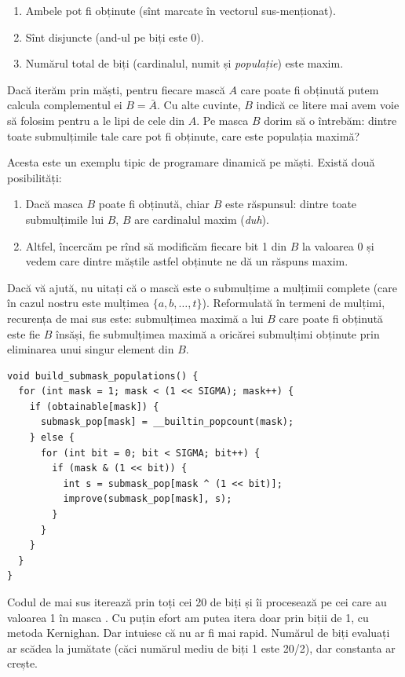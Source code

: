 \documentclass[../main.tex]{subfiles}
\begin{document}
\begin{enumerate}
  \item Ambele pot fi obținute (sînt marcate în vectorul sus-menționat).
  \item Sînt disjuncte (and-ul pe biți este 0).
  \item Numărul  total de biți (cardinalul, numit și \textit{populație}) este maxim.
\end{enumerate}

Dacă iterăm prin măști, pentru fiecare mască $A$ care poate fi obținută putem calcula complementul ei $B = \bar{A}$. Cu alte cuvinte, $B$ indică ce litere mai avem voie să folosim pentru a le lipi de cele din $A$. Pe masca $B$ dorim să o întrebăm: dintre toate submulțimile tale care pot fi obținute, care este populația maximă?

Acesta este un exemplu tipic de programare dinamică pe măști. Există două posibilități:

\begin{enumerate}
  \item Dacă masca $B$ poate fi obținută, chiar $B$ este răspunsul: dintre toate submulțimile lui $B$, $B$ are cardinalul maxim (\textit{duh}).

  \item Altfel, încercăm pe rînd să modificăm fiecare bit 1 din $B$ la valoarea 0 și vedem care dintre măștile astfel obținute ne dă un răspuns maxim.
\end{enumerate}

Dacă vă ajută, nu uitați că o mască este o submulțime a mulțimii complete (care în cazul nostru este mulțimea $\{a, b, \dots, t\}$). Reformulată în termeni de mulțimi, recurența de mai sus este: submulțimea maximă a lui $B$ care poate fi obținută este fie $B$ însăși, fie submulțimea maximă a oricărei submulțimi obținute prin eliminarea unui singur element din $B$.

\begin{verbatim}
void build_submask_populations() {
  for (int mask = 1; mask < (1 << SIGMA); mask++) {
    if (obtainable[mask]) {
      submask_pop[mask] = __builtin_popcount(mask);
    } else {
      for (int bit = 0; bit < SIGMA; bit++) {
        if (mask & (1 << bit)) {
          int s = submask_pop[mask ^ (1 << bit)];
          improve(submask_pop[mask], s);
        }
      }
    }
  }
}
\end{verbatim}

Codul de mai sus iterează prin toți cei 20 de biți și îi procesează pe cei care au valoarea 1 în masca . Cu puțin efort am putea itera doar prin biții de 1, cu metoda Kernighan. Dar intuiesc că nu ar fi mai rapid. Numărul de biți evaluați ar scădea la jumătate (căci numărul mediu de biți 1 este 20/2), dar constanta ar crește.
\end{document}
